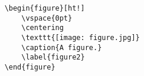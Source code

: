 \begin{verbatim}
	\begin{figure}[ht!]
		\vspace{0pt}
		\centering
		\texttt{[image: figure.jpg]}
		\caption{A figure.}
		\label{figure2}
	\end{figure}
\end{verbatim}